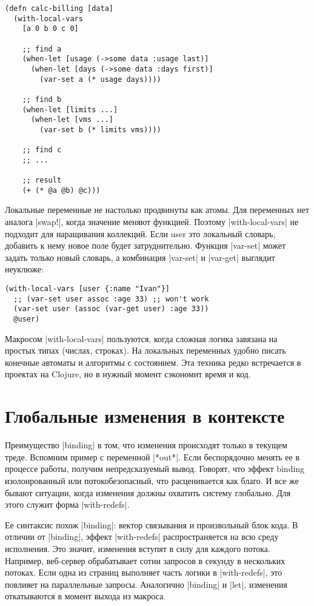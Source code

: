 {{{{{{{{\begin{verbatim}
(defn calc-billing [data]
  (with-local-vars
    [a 0 b 0 c 0]

    ;; find a
    (when-let [usage (->some data :usage last)]
      (when-let [days (->some data :days first)]
        (var-set a (* usage days))))

    ;; find b
    (when-let [limits ...]
      (when-let [vms ...]
        (var-set b (* limits vms))))

    ;; find c
    ;; ...

    ;; result
    (+ (* @a @b) @c)))
\end{verbatim}

Локальные переменные не настолько продвинуты как атомы. Для переменных нет
аналога \spverb|swap!|, когда значение меняют функцией. Поэтому \spverb|with-local-vars| не
подходит для наращивания коллекций. Если user это локальный словарь, добавить к
нему новое поле будет затруднительно. Функция \spverb|var-set| может задать только
новый словарь, а комбинация \spverb|var-set| и \spverb|var-get| выглядит неуклюже:

\begin{verbatim}
(with-local-vars [user {:name "Ivan"}]
  ;; (var-set user assoc :age 33) ;; won't work
  (var-set user (assoc (var-get user) :age 33))
  @user)
\end{verbatim}

Макросом \spverb|with-local-vars| пользуются, когда сложная логика завязана на простых
типах (числах, строках). На локальных переменных удобно писать конечные автоматы
и алгоритмы с состоянием. Эта техника редко встречается в проектах на Clojure,
но в нужный момент сэкономит время и код.

\section{Глобальные изменения в контексте}

Преимущество \spverb|binding| в том, что изменения происходят только в текущем
треде. Вспомним пример с переменной \spverb|*out*|. Если беспорядочно менять ее в
процессе работы, получим непредсказуемый вывод. Говорят, что эффект binding
изолоированный или потокобезопасный, что расценивается как благо. И все же
бывают ситуации, когда изменения должны охватить систему глобально. Для этого
служит форма \spverb|with-redefs|.

Ее синтаксис похож \spverb|binding|: вектор связывания и произвольный блок кода. В
отличии от \spverb|binding|, эффект \spverb|with-redefs| распространяется на всю среду
исполнения. Это значит, изменения вступят в силу для каждого потока. Например,
веб-сервер обрабатывает сотни запросов в секунду в нескольких потоках. Если одна
из страниц выполняет часть логики в \spverb|with-redefs|, это повлияет на параллельные
запросы. Аналогично \spverb|binding| и \spverb|let|, изменения откатываются в момент выхода из
макроса.

}}}}}}}}
